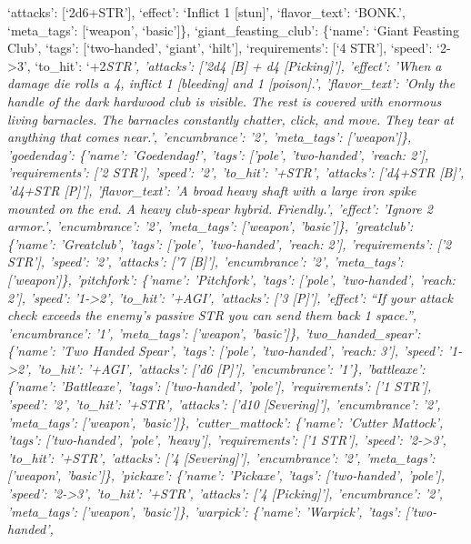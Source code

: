 \documentclass[
  letterpaper,
  DIV=11,
  numbers=noendperiod]{scrartcl}
\begin{document}
`attacks': {[}`2d6+STR'{]}, `effect': `Inflict 1 {[}stun{]}',
`flavor\_text': `BONK.', `meta\_tags': {[}`weapon', `basic'{]}\},
`giant\_feasting\_club': \{`name': `Giant Feasting Club', `tags':
{[}`two-handed', `giant', `hilt'{]}, `requirements': {[}`4 STR'{]},
`speed': `2-\textgreater3', `to\_hit': `+2\emph{STR', 'attacks': {[}'2d4
{[}B{]} + d4 {[}Picking{]}'{]}, 'effect': 'When a damage die rolls a 4,
inflict 1 {[}bleeding{]} and 1 {[}poison{]}.', 'flavor\_text': 'Only the
handle of the dark hardwood club is visible. The rest is covered with
enormous living barnacles. The barnacles constantly chatter, click, and
move. They tear at anything that comes near.', 'encumbrance': '2',
'meta\_tags': {[}'weapon'{]}\}, 'goedendag': \{'name': 'Goedendag!',
'tags': {[}'pole', 'two-handed', 'reach: 2'{]}, 'requirements': {[}'2
STR'{]}, 'speed': '2', 'to\_hit': '+STR', 'attacks': {[}'d4+STR
{[}B{]}', 'd4+STR {[}P{]}'{]}, 'flavor\_text': 'A broad heavy shaft with
a large iron spike mounted on the end. A heavy club-spear hybrid.
Friendly.', 'effect': 'Ignore 2 armor.', 'encumbrance': '2',
'meta\_tags': {[}'weapon', 'basic'{]}\}, 'greatclub': \{'name':
'Greatclub', 'tags': {[}'pole', 'two-handed', 'reach: 2'{]},
'requirements': {[}'2 STR'{]}, 'speed': '2', 'attacks': {[}'7
{[}B{]}'{]}, 'encumbrance': '2', 'meta\_tags': {[}'weapon'{]}\},
'pitchfork': \{'name': 'Pitchfork', 'tags': {[}'pole', 'two-handed',
'reach: 2'{]}, 'speed': '1-\textgreater2', 'to\_hit': '+AGI', 'attacks':
{[}'3 {[}P{]}'{]}, 'effect': ``If your attack check exceeds the enemy's
passive STR you can send them back 1 space.'', 'encumbrance': '1',
'meta\_tags': {[}'weapon', 'basic'{]}\}, 'two\_handed\_spear': \{'name':
'Two Handed Spear', 'tags': {[}'pole', 'two-handed', 'reach: 3'{]},
'speed': '1-\textgreater2', 'to\_hit': '+AGI', 'attacks': {[}'d6
{[}P{]}'{]}, 'encumbrance': '1'\}, 'battleaxe': \{'name': 'Battleaxe',
'tags': {[}'two-handed', 'pole'{]}, 'requirements': {[}'1 STR'{]},
'speed': '2', 'to\_hit': '+STR', 'attacks': {[}'d10 {[}Severing{]}'{]},
'encumbrance': '2', 'meta\_tags': {[}'weapon', 'basic'{]}\},
'cutter\_mattock': \{'name': 'Cutter Mattock', 'tags': {[}'two-handed',
'pole', 'heavy'{]}, 'requirements': {[}'1 STR'{]}, 'speed':
'2-\textgreater3', 'to\_hit': '+STR', 'attacks': {[}'4
{[}Severing{]}'{]}, 'encumbrance': '2', 'meta\_tags': {[}'weapon',
'basic'{]}\}, 'pickaxe': \{'name': 'Pickaxe', 'tags': {[}'two-handed',
'pole'{]}, 'speed': '2-\textgreater3', 'to\_hit': '+STR', 'attacks':
{[}'4 {[}Picking{]}'{]}, 'encumbrance': '2', 'meta\_tags': {[}'weapon',
'basic'{]}\}, 'warpick': \{'name': 'Warpick', 'tags': {[}'two-handed',
}
\end{document}
